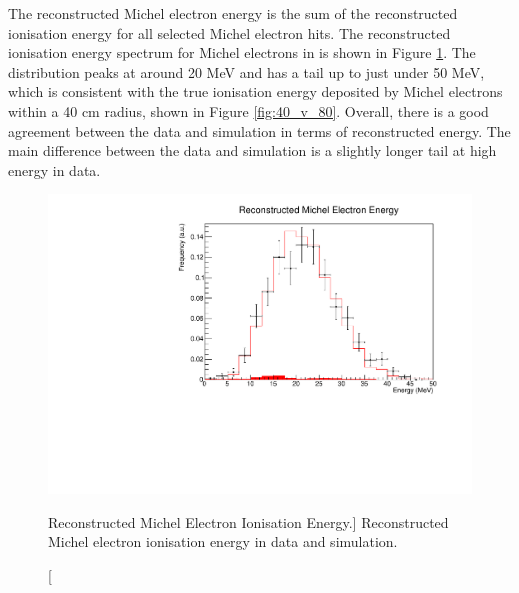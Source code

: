 The reconstructed Michel electron energy is the sum of the reconstructed
ionisation energy for all selected Michel electron hits. The reconstructed 
ionisation energy spectrum for Michel electrons in \protodune{} is shown in 
Figure \ref{fig:michel_ion_reco}. The distribution peaks at around 20 MeV and 
has a tail up to just under 50 MeV, which is consistent with the true 
ionisation energy deposited by Michel electrons within a 40 cm radius, shown 
in Figure \ref{fig:40_v_80}. Overall, there is a good agreement between the data
and simulation in terms of reconstructed energy. The main difference between the
data and simulation is a slightly longer tail at high energy in data.
\begin{figure}
	\centering
	\includegraphics[width=\textwidth]{figures/michel_ion_reco.pdf}
	\caption
	[Reconstructed Michel Electron Ionisation Energy.]
	{Reconstructed Michel electron ionisation energy in data and simulation.}
	\label{fig:michel_ion_reco}
\end{figure}

